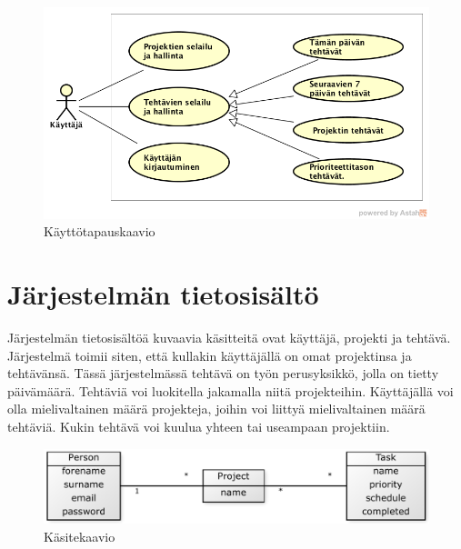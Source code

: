 \documentclass[12pt,a4paper,oneside,titlepage,pdftex]{article}
\begin{document}
\begin{figure}[htb]
\begin{center}
\includegraphics[width=\textwidth]{img/kayttotapauskaavio.png}
\caption{Käyttötapauskaavio}
\label{kasitekaavio}
\end{center}
\end{figure}

\section{Järjestelmän tietosisältö}

Järjestelmän tietosisältöä kuvaavia käsitteitä ovat käyttäjä, projekti ja tehtävä. Järjestelmä toimii siten, että kullakin käyttäjällä on omat projektinsa ja tehtävänsä. Tässä järjestelmässä tehtävä on työn perusyksikkö, jolla on tietty päivämäärä. Tehtäviä voi luokitella jakamalla niitä projekteihin. Käyttäjällä voi olla mielivaltainen määrä projekteja, joihin voi liittyä mielivaltainen määrä tehtäviä. Kukin tehtävä voi kuulua yhteen tai useampaan projektiin.

\begin{figure}[htbp]
\begin{center}
\includegraphics[width=\textwidth]{img/kasitekaavio.pdf}
\caption{Käsitekaavio}
\label{kasitekaavio}
\end{center}
\end{figure}
\end{document}
